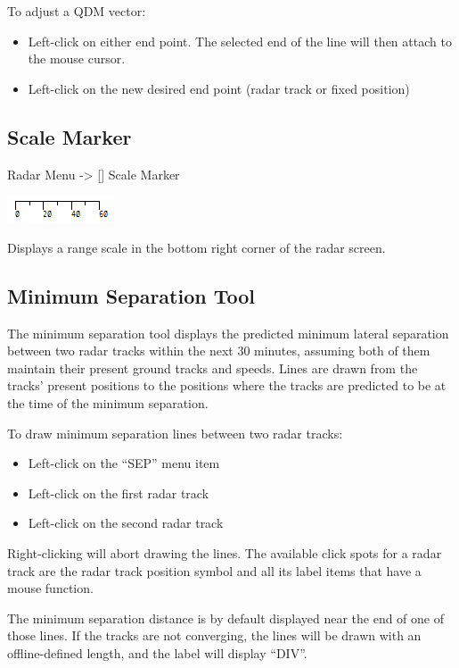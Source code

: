 \documentclass[11pt,a4paper]{memoir}
\begin{document}
To adjust a QDM vector:

\begin{itemize}
    \item Left-click on either end point. The selected end of the line will then attach to the mouse cursor.
    \item Left-click on the new desired end point (radar track or fixed position)
\end{itemize}

\subsection{Scale Marker}
\label{scale}

Radar Menu -> [] Scale Marker

\includegraphics{img/scale.png}

Displays a range scale in the bottom right corner of the radar screen.

\subsection{Minimum Separation Tool}
\label{mmtool}

The minimum separation tool displays the predicted minimum lateral separation between two radar tracks within the next 30 minutes, assuming both of them maintain their present ground tracks and speeds. Lines are drawn from the tracks’ present positions to the positions where the tracks are predicted to be at the time of the minimum separation.

To draw minimum separation lines between two radar tracks:
\begin{itemize}
    \item Left-click on the “SEP” menu item
    \item Left-click on the first radar track
    \item Left-click on the second radar track
\end{itemize}

Right-clicking will abort drawing the lines. The available click spots for a radar track are the radar track position symbol and all its label items that have a mouse function.

The minimum separation distance is by default displayed near the end of one of those lines. If the tracks are not converging, the lines will be drawn with an offline-defined length, and the label will display “DIV”.
\end{document}

